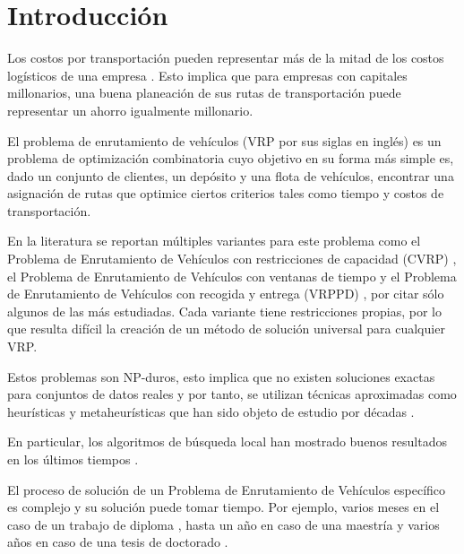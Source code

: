 \chapter*{Introducción}\label{chapter:introduction}

\qquad 
Los costos por transportación pueden representar más de la mitad de los costos logísticos de una empresa \cite{factoid}. Esto implica que para empresas con capitales millonarios, una buena planeación de sus rutas de transportación puede representar un ahorro igualmente millonario.

El problema de enrutamiento de vehículos (VRP por sus siglas en inglés) es un problema de optimización combinatoria cuyo objetivo en su forma más simple es, dado un conjunto de clientes, un depósito y una flota de vehículos, encontrar una asignación de rutas que optimice ciertos criterios tales como tiempo y costos de transportación.

En la literatura se reportan múltiples variantes para este problema como el Problema de Enrutamiento de Vehículos con restricciones de capacidad (CVRP) \cite{CVRP}, el Problema de Enrutamiento de Vehículos con ventanas de tiempo y el Problema de Enrutamiento de Vehículos con recogida y entrega (VRPPD) \cite{2002vehicle}, por citar sólo algunos de las más estudiadas. Cada variante tiene restricciones propias, por lo que resulta difícil la creación de un método de solución universal para cualquier VRP.

Estos problemas son NP-duros, esto implica que no existen soluciones exactas para conjuntos de datos reales y por tanto, se utilizan técnicas aproximadas como heurísticas y metaheurísticas que han sido objeto de estudio por décadas \cite{1964scheduling,1974networks,1981complexity,1997tabu,2002vehicle}.

En particular, los algoritmos de búsqueda local han mostrado buenos resultados en los últimos tiempos \cite{TODO}.

El proceso de solución de un Problema de Enrutamiento de Vehículos específico es complejo y su solución puede tomar tiempo. Por ejemplo, varios meses en el caso de un trabajo de diploma \cite{TODO}, hasta un año en caso de una maestría \cite{Alina2010} y varios años en caso de una tesis de doctorado \cite{Alina2017}.

